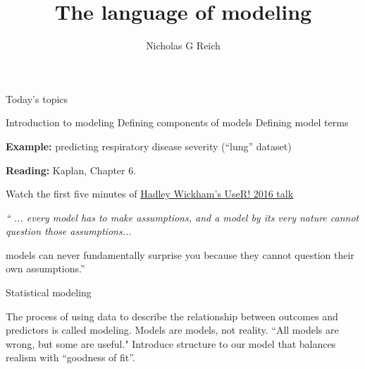 \documentclass[table]{beamer}\usepackage[]{graphicx}\usepackage[]{color}
\title{The language of modeling}
\author{Nicholas G Reich}
\begin{document}
\begin{frame}[plain]
	\titlepage
\end{frame}











\begin{frame}{Today's topics}

\bi
    \myitem Introduction to modeling 
    \myitem Defining components of models
    \myitem Defining model terms
\ei

\bigskip

{\bf Example:} predicting respiratory disease severity (``lung'' dataset)

\bigskip

{\bf Reading:} Kaplan, Chapter 6.


\end{frame}


\begin{frame}%

 Watch the first five minutes of \href{https://channel9.msdn.com/Events/useR-international-R-User-conference/useR2016/Towards-a-grammar-of-interactive-graphics}{Hadley Wickham's UseR! 2016 talk}

\vspace{1cm} 

\centering
\em
  `` ... every model has to make assumptions, and a model by its very nature cannot question those assumptions...

\vspace{1cm} 
  
 models can never fundamentally surprise you because they cannot question their own assumptions.'' %


\end{frame}


\begin{frame}{Statistical modeling}

The process of using data to describe the relationship between outcomes and predictors is called modeling.
\bi
  \myitem Models are models, not reality.
  \myitem ``All models are wrong, but some are useful." 
  \myitem Introduce structure to our model that balances realism with ``goodness of fit''. 
\ei

\end{frame}
\end{document}
